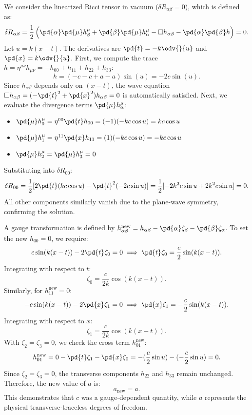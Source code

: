 \begin{solution}[(i)]
  We consider the linearized Ricci tensor in vacuum ($\delta R_{\alpha\beta} = 0$), which is defined as:
  \[%
    \delta R_{\alpha\beta} = \frac{1}{2} \left(\pd{\alpha} \pd{\mu} h^\mu_\beta + \pd{\beta} \pd{\mu} h^\mu_\alpha - \square h_{\alpha\beta} - \pd{\alpha} \pd{\beta} h\right) = 0
  .\]%
  Let $u = k(x-t)$. The derivatives are $\pd{t} = -k \odv{}{u}$ and $\pd{x} = k \odv{}{u}$. First, we compute the trace $h = \eta^{\mu\nu}h_{\mu\nu} = -h_{00} + h_{11} + h_{22} + h_{33}$:
  \[%
    h = (-c - c + a - a)\sin(u) = -2c\sin(u)
  .\]%
  Since $h_{\alpha\beta}$ depends only on $(x-t)$, the wave equation $\square h_{\alpha\beta} = (-\pd{t}^2 + \pd{x}^2)h_{\alpha\beta} = 0$ is automatically satisfied. Next, we evaluate the divergence terms $\pd{\mu} h^\mu_\alpha$:
  \begin{itemize}
    \item $\pd{\mu} h^\mu_0 = \eta^{00}\pd{t} h_{00} = (-1)(-kc \cos u) = kc \cos u$
    \item $\pd{\mu} h^\mu_1 = \eta^{11}\pd{x} h_{11} = (1)(-kc \cos u) = -kc \cos u$
    \item $\pd{\mu} h^\mu_2 = \pd{\mu} h^\mu_3 = 0$
  \end{itemize}
  Substituting into $\delta R_{00}$:
  \[%
    \delta R_{00} = \frac{1}{2} [ 2\pd{t}(kc \cos u) - \pd{t}^2(-2c \sin u) ] = \frac{1}{2} [ -2k^2c \sin u + 2k^2c \sin u ] = 0
  .\]%
  All other components similarly vanish due to the plane-wave symmetry, confirming the solution.
\end{solution}

\begin{solution}[(ii)]
  A gauge transformation is defined by $h_{\alpha\beta}^{\text{new}} = h_{\alpha\beta} - \pd{\alpha} \zeta_\beta - \pd{\beta} \zeta_\alpha$. To set the new $h_{00} = 0$, we require:
  \[%
    c \sin(k(x-t)) - 2\pd{t} \zeta_0 = 0 \implies \pd{t} \zeta_0 = \frac{c}{2} \sin(k(x-t))
  .\]%
  Integrating with respect to $t$:
  \[%
    \zeta_0 = \frac{c}{2k} \cos(k(x-t))
  .\]%
  Similarly, for $h_{11}^{\text{new}} = 0$:
  \[%
    -c \sin(k(x-t)) - 2\pd{x} \zeta_1 = 0 \implies \pd{x} \zeta_1 = -\frac{c}{2} \sin(k(x-t))
  .\]%
  Integrating with respect to $x$:
  \[%
    \zeta_1 = \frac{c}{2k} \cos(k(x-t))
  .\]%
  With $\zeta_2 = \zeta_3 = 0$, we check the cross term $h_{01}^{\text{new}}$:
  \[%
    h_{01}^{\text{new}} = 0 - \pd{t} \zeta_1 - \pd{x} \zeta_0 = -(\frac{c}{2} \sin u) - (-\frac{c}{2} \sin u) = 0
  .\]%
  Since $\zeta_2 = \zeta_3 = 0$, the transverse components $h_{22}$ and $h_{33}$ remain unchanged. Therefore, the new value of $a$ is:
  \[%
    a_{\text{new}} = a
  .\]%
  This demonstrates that $c$ was a gauge-dependent quantity, while $a$ represents the physical transverse-traceless degrees of freedom.
\end{solution}
